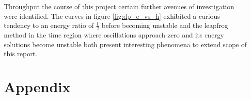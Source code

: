 \documentclass[11pt]{article}
\begin{document}
Throughput the course of this project certain further avenues of investigation were identified. The curves in figure \ref{fig:dp_e_vs_h} exhibited a curious tendency to an energy ratio of $\frac{1}{2}$ before becoming unstable and the leapfrog method in the time region where oscillations approach zero and its energy solutions become unstable both present interesting phenomena to extend scope of this report.

\newpage
\section{Appendix} \label{app:Appendix}

\end{document}
